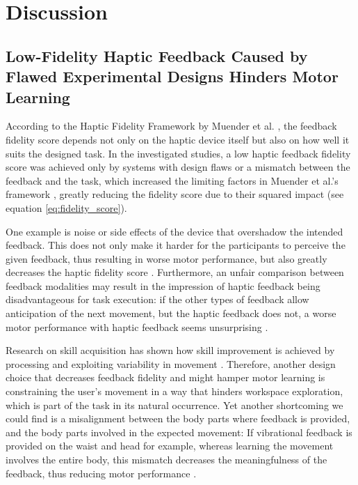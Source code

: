 \section{Discussion}

\subsection{Low-Fidelity Haptic Feedback Caused by Flawed Experimental Designs Hinders Motor Learning}
According to the Haptic Fidelity Framework by Muender et al. \cite{Muender2022HapticReality}, the feedback fidelity score depends not only on the haptic device itself but also on how well it suits the designed task. In the investigated studies, a low haptic feedback fidelity score was achieved only by systems with design flaws or a mismatch between the feedback and the task, which increased the limiting factors in Muender et al.'s framework \cite{Muender2022HapticReality}, greatly reducing the fidelity score due to their squared impact (see equation \ref{eq:fidelity_score}). 

One example is noise or side effects of the device that overshadow the intended feedback. This does not only make it harder for the participants to perceive the given feedback, thus resulting in worse motor performance, but also greatly decreases the haptic fidelity score \cite{Lee2012}. Furthermore, an unfair comparison between feedback modalities may result in the impression of haptic feedback being disadvantageous for task execution: if the other types of feedback allow anticipation of the next movement, but the haptic feedback does not, a worse motor performance with haptic feedback seems unsurprising \cite{Lee2012}.

Research on skill acquisition has shown how skill improvement is achieved by processing and exploiting variability in movement \cite{Sternad2018ItsLearning}. Therefore, another design choice that decreases feedback fidelity and might hamper motor learning is constraining the user's movement in a way that hinders workspace exploration, which is part of the task in its natural occurrence.
Yet another shortcoming we could find is a misalignment between the body parts where feedback is provided, and the body parts involved in the expected movement: If vibrational feedback is provided on the waist and head for example, whereas learning the movement involves the entire body, this mismatch decreases the meaningfulness of the feedback, thus reducing motor performance \cite{Hanashima2023}.

